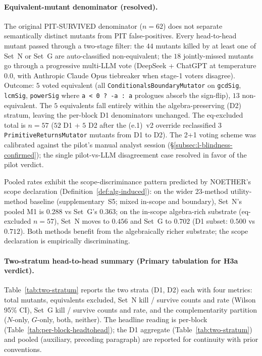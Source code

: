 \documentclass[acmsmall, screen]{acmart}
\begin{document}
\paragraph{Equivalent-mutant denominator (resolved).}\label{para:eq-mutant-footnote}
The original PIT-SURVIVED denominator ($n = 62$) does not separate semantically distinct mutants from PIT false-positives. Every head-to-head mutant passed through a two-stage filter: the $44$ mutants killed by at least one of Set~N or Set~G are auto-classified non-equivalent; the $18$ jointly-missed mutants go through a progressive multi-LLM vote (DeepSeek + ChatGPT at temperature $0.0$, with Anthropic Claude Opus tiebreaker when stage-1 voters disagree). Outcome: $5$ voted equivalent (all \texttt{ConditionalsBoundaryMutator} on \texttt{gcdSig}, \texttt{lcmSig}, \texttt{powerSig} where \texttt{a < 0 ? -a : a} prologues absorb the sign-flip), $13$ non-equivalent. The $5$ equivalents fall entirely within the algebra-preserving (D2) stratum, leaving the per-block D1 denominators unchanged. The eq-excluded total is $n = 57$ ($52$ D1 + $5$ D2 after the (e.1)~v2 override reclassified $3$ \texttt{PrimitiveReturnsMutator} mutants from D1 to D2). The 2+1 voting scheme was calibrated against the pilot's manual analyst session (\S\ref{subsec:l-blindness-confirmed}); the single pilot-vs-LLM disagreement case resolved in favor of the pilot verdict.

Pooled rates exhibit the scope-discriminance pattern predicted by NOETHER's scope declaration (Definition~\ref{def:alg-induced}): on the wider 23-method utility-method baseline (supplementary~S5; mixed in-scope and boundary), Set~N's pooled M1 is $0.288$ vs Set~G's $0.363$; on the in-scope algebra-rich substrate (eq-excluded $n = 57$), Set~N moves to $0.456$ and Set~G to $0.702$ (D1 subset: $0.500$ vs $0.712$). Both methods benefit from the algebraically richer substrate; the scope declaration is empirically discriminating.

\paragraph{Two-stratum head-to-head summary (Primary tabulation for H3a verdict).}
\label{para:two-stratum}
Table~\ref{tab:two-stratum} reports the two strata (D1, D2) each
with four metrics: total mutants, equivalents excluded, Set~N kill
/ survive counts and rate (Wilson 95\% CI), Set~G kill / survive
counts and rate, and the complementarity partition ($N$-only,
$G$-only, both, neither). The headline reading is per-block
(Table~\ref{tab:per-block-headtohead}); the D1 aggregate
(Table~\ref{tab:two-stratum}) and pooled (auxiliary, preceding
paragraph) are reported for continuity with prior conventions.
\end{document}
